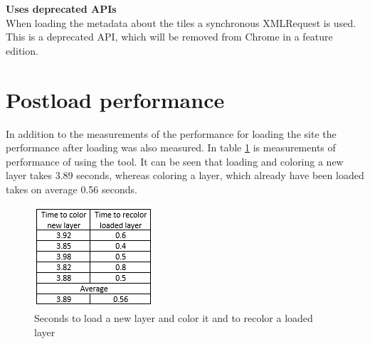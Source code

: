 
\citep{HTTP2}

\textbf{Uses deprecated APIs}\\
When loading the metadata about the tiles a synchronous XMLRequest is used. This is a deprecated API, which will be removed from Chrome in a feature edition. 
\citep{OldApis}
\section{Postload performance}

In addition to the measurements of the performance for loading the site the performance after loading was also measured. In table \ref{tabPostloadPerformance} is measurements of performance of using the tool. It can be seen that loading and coloring a new layer takes 3.89 seconds, whereas coloring a layer, which already have been loaded takes on average 0.56 seconds. 

\begin{figure} [H]
	\centering
	\includegraphics[width=.4\textwidth]{Pictures/tabPostloadPerformance}
	\caption{Seconds to load a new layer and color it and to recolor a loaded layer}
	\label{tabPostloadPerformance}
\end{figure}